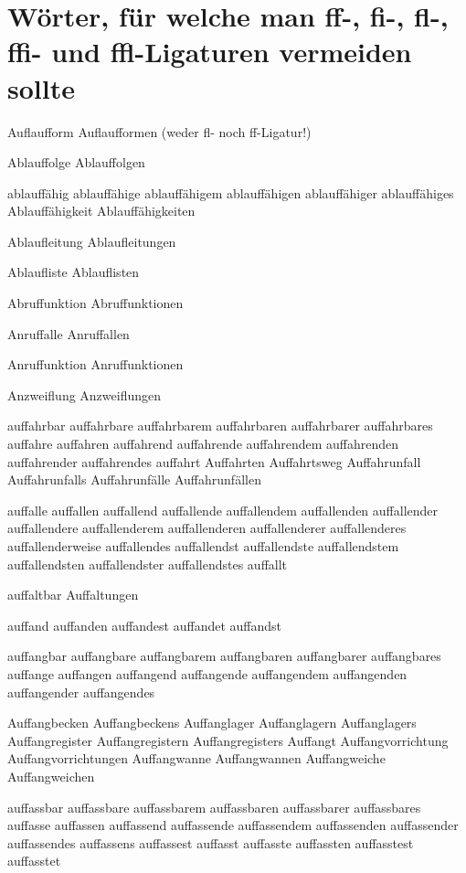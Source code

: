 

\section*{Wörter, für welche man ff-, fi-, fl-, ffi- und ffl-Ligaturen vermeiden sollte}

Auflaufform Auflaufformen (weder fl- noch ff-Ligatur!)

\medskip
Ablauffolge Ablauffolgen

ablauffähig ablauffähige ablauffähigem ablauffähigen ablauffähiger ablauffähiges Ablauffähigkeit Ablauffähigkeiten

Ablaufleitung Ablaufleitungen

Ablaufliste Ablauflisten

Abruffunktion Abruffunktionen

Anruffalle Anruffallen

Anruffunktion Anruffunktionen

Anzweiflung Anzweiflungen

auffahrbar auffahrbare auffahrbarem auffahrbaren auffahrbarer auffahrbares auffahre auffahren auffahrend auffahrende auffahrendem auffahrenden auffahrender auffahrendes auffahrt Auffahrten Auffahrtsweg Auffahrunfall Auffahrunfalls Auffahrunfälle Auffahrunfällen

auffalle auffallen auffallend auffallende auffallendem auffallenden auffallender auffallendere auffallenderem auffallenderen auffallenderer auffallenderes auffallenderweise auffallendes auffallendst auffallendste auffallendstem auffallendsten auffallendster auffallendstes auffallt

auffaltbar Auffaltungen

auffand auffanden auffandest auffandet auffandst

auffangbar auffangbare auffangbarem auffangbaren auffangbarer auffangbares auffange auffangen auffangend auffangende auffangendem auffangenden auffangender auffangendes 

Auffangbecken Auffangbeckens Auffanglager Auffanglagern Auffanglagers Auffangregister Auffangregistern Auffangregisters Auffangt Auffangvorrichtung Auffangvorrichtungen Auffangwanne Auffangwannen Auffangweiche Auffangweichen

auffassbar auffassbare auffassbarem auffassbaren auffassbarer auffassbares auffasse auffassen auffassend auffassende auffassendem auffassenden auffassender auffassendes auffassens auffassest auffasst auffasste auffassten auffasstest auffasstet 

